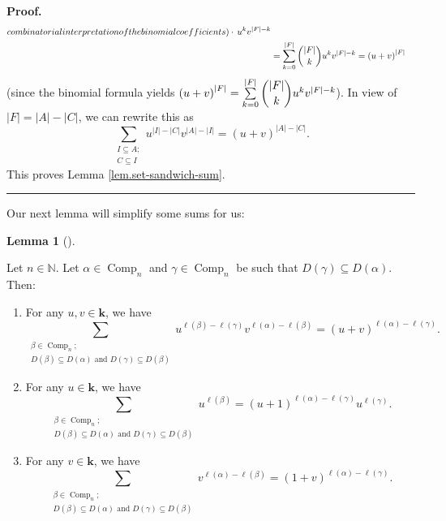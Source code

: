\documentclass[numbers=enddot,12pt,final,onecolumn,notitlepage]{scrartcl}%
\theoremstyle{definition}
\newtheorem{lem}[theo]{Lemma}
\newenvironment{lemma}[1][]
{\begin{lem}[#1]\begin{leftbar}}
{\end{leftbar}\end{lem}}
\newenvironment{proof}[1][Proof]{\noindent\textbf{#1.} }{\ \rule{0.5em}{0.5em}}
\let\sumnonlimits\sum
\renewcommand{\sum}{\sumnonlimits\limits}
\newenvironment{verlong}{}{}
\begin{document}
\begin{verlong}
\begin{proof}
\begin{align*}
{{{combinatorial interpretation of the binomial coefficients)}}}\cdot
\,u^{k}v^{\left\vert F\right\vert -k}\\
&  =\sum_{k=0}^{\left\vert F\right\vert }\dbinom{\left\vert F\right\vert }%
{k}u^{k}v^{\left\vert F\right\vert -k}=\left(  u+v\right)  ^{\left\vert
F\right\vert }%
\end{align*}
(since the binomial formula yields $\left(  u+v\right)  ^{\left\vert
F\right\vert }=\sum_{k=0}^{\left\vert F\right\vert }\dbinom{\left\vert
F\right\vert }{k}u^{k}v^{\left\vert F\right\vert -k}$). In view of $\left\vert
F\right\vert =\left\vert A\right\vert -\left\vert C\right\vert $, we can
rewrite this as%
\[
\sum_{\substack{I\subseteq A;\\C\subseteq I}}u^{\left\vert I\right\vert
-\left\vert C\right\vert }v^{\left\vert A\right\vert -\left\vert I\right\vert
}=\left(  u+v\right)  ^{\left\vert A\right\vert -\left\vert C\right\vert }.
\]
This proves Lemma \ref{lem.set-sandwich-sum}.
\end{proof}

Our next lemma will simplify some sums for us:
\end{verlong}

\begin{lemma}
\label{lem.Comp-sandwich-sum}Let $n\in\mathbb{N}$. Let $\alpha\in
\operatorname*{Comp}\nolimits_{n}$ and $\gamma\in\operatorname*{Comp}%
\nolimits_{n}$ be such that $D\left(  \gamma\right)  \subseteq D\left(
\alpha\right)  $. Then:

\begin{enumerate}
\item[\textbf{(a)}] For any $u,v\in\mathbf{k}$, we have%
\[
\sum_{\substack{\beta\in\operatorname*{Comp}\nolimits_{n};\\D\left(
\beta\right)  \subseteq D\left(  \alpha\right)  \text{ and }D\left(
\gamma\right)  \subseteq D\left(  \beta\right)  }}u^{\ell\left(  \beta\right)
-\ell\left(  \gamma\right)  }v^{\ell\left(  \alpha\right)  -\ell\left(
\beta\right)  }=\left(  u+v\right)  ^{\ell\left(  \alpha\right)  -\ell\left(
\gamma\right)  }.
\]


\item[\textbf{(b)}] For any $u\in\mathbf{k}$, we have%
\[
\sum_{\substack{\beta\in\operatorname*{Comp}\nolimits_{n};\\D\left(
\beta\right)  \subseteq D\left(  \alpha\right)  \text{ and }D\left(
\gamma\right)  \subseteq D\left(  \beta\right)  }}u^{\ell\left(  \beta\right)
}=\left(  u+1\right)  ^{\ell\left(  \alpha\right)  -\ell\left(  \gamma\right)
}u^{\ell\left(  \gamma\right)  }.
\]


\item[\textbf{(c)}] For any $v\in\mathbf{k}$, we have%
\[
\sum_{\substack{\beta\in\operatorname*{Comp}\nolimits_{n};\\D\left(
\beta\right)  \subseteq D\left(  \alpha\right)  \text{ and }D\left(
\gamma\right)  \subseteq D\left(  \beta\right)  }}v^{\ell\left(
\alpha\right)  -\ell\left(  \beta\right)  }=\left(  1+v\right)  ^{\ell\left(
\alpha\right)  -\ell\left(  \gamma\right)  }.
\]

\end{enumerate}
\end{lemma}
\end{document}
